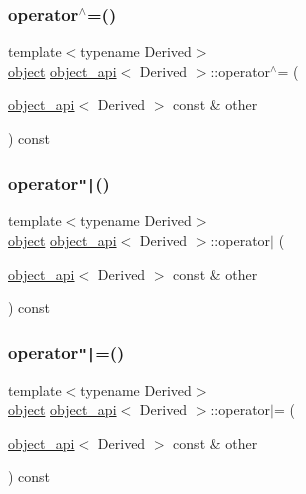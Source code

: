 \mbox{\label{classobject__api_aa0287f61e2ec9962bead679f640c62ea}} 
\subsubsection{\texorpdfstring{operator$^\wedge$=()}{operator^=()}}
{\footnotesize\ttfamily template$<$typename Derived$>$ \\
\mbox{\hyperlink{classobject}{object}} \mbox{\hyperlink{classobject__api}{object\+\_\+api}}$<$ Derived $>$\+::operator$^\wedge$= (\begin{DoxyParamCaption}\item[{\mbox{\hyperlink{classobject__api}{object\+\_\+api}}$<$ Derived $>$ const \&}]{other }\end{DoxyParamCaption}) const}

\mbox{\label{classobject__api_afd4b5ba4bd12f50897ecd210af322703}} 
\subsubsection{\texorpdfstring{operator\texttt{"|}()}{operator|()}}
{\footnotesize\ttfamily template$<$typename Derived$>$ \\
\mbox{\hyperlink{classobject}{object}} \mbox{\hyperlink{classobject__api}{object\+\_\+api}}$<$ Derived $>$\+::operator$\vert$ (\begin{DoxyParamCaption}\item[{\mbox{\hyperlink{classobject__api}{object\+\_\+api}}$<$ Derived $>$ const \&}]{other }\end{DoxyParamCaption}) const}

\mbox{\label{classobject__api_a625aa25cf930253e2e731349b91d8048}} 
\subsubsection{\texorpdfstring{operator\texttt{"|}=()}{operator|=()}}
{\footnotesize\ttfamily template$<$typename Derived$>$ \\
\mbox{\hyperlink{classobject}{object}} \mbox{\hyperlink{classobject__api}{object\+\_\+api}}$<$ Derived $>$\+::operator$\vert$= (\begin{DoxyParamCaption}\item[{\mbox{\hyperlink{classobject__api}{object\+\_\+api}}$<$ Derived $>$ const \&}]{other }\end{DoxyParamCaption}) const}

